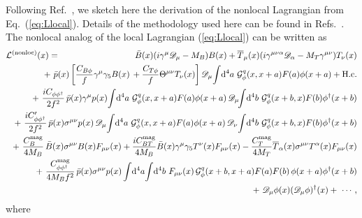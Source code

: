 \documentclass[preprintnumbers,prd,superscriptaddress,preprint]{revtex4-1}
\begin{document}
Following Ref.~\cite{Salamu:2018cny}, we sketch here the derivation of the nonlocal Lagrangian from Eq.~(\ref{eq:Llocal}).
Details of the methodology used here can be found in Refs.~\cite{Terning:1991yt, Holdom:1992fn, Faessler:2003yf, Wang:1996zu, He:2017viu, He:2018eyz}.
The nonlocal analog of the local Lagrangian (\ref{eq:Llocal}) can be written as
%
\begin{eqnarray}
{\cal L}^{\rm (nonloc)}(x)
&=& \bar B(x) (i\gamma^\mu \mathscr{D}_\mu - M_B) B(x)
+ \overline{T}_\mu(x)
  (i\gamma^{\mu\nu\alpha} \mathscr{D}_\alpha - M_T \gamma^{\mu\nu})
  T_\nu(x)
\notag\\
& & \hspace*{-2.2cm}
+\ \bar{p}(x)
  \left[
    \frac{C_{B\phi}}{f} \gamma^\mu \gamma_5 B(x)\,
  + \frac{C_{T\phi}}{f} \Theta^{\mu\nu} T_\nu(x)
  \right]
  \mathscr{D}_\mu\!
  \int\!\dd[4]{a}\, {\cal G}_\phi^q(x,x+a) F(a) \phi(x+a)
  + {\rm H.c.}
\notag\\
& & \hspace*{-2.2cm}
+\ \frac{i C_{\phi\phi^\dag}}{2 f^2}\,
  \bar{p}(x) \gamma^\mu p(x)\!                           
  \int\!\dd[4]{a}\, {\cal G}_\phi^q(x,x+a) F(a) \phi(x+a)\,
  \mathscr{D}_\mu\!\!
  \int\!\dd[4]{b}\, {\cal G}_\phi^q(x+b,x) F(b) \phi^\dag(x+b)
\notag\\
& & \hspace*{-2.2cm}
+\ \frac{i C_{\phi\phi^\dag}'}{2 f^2}\,
  \bar{p}(x) \sigma^{\mu\nu} p(x)\,				
  \mathscr{D}_\mu\! \int\!\dd[4]{a}\, {\cal G}_\phi^q(x,x+a) F(a) \phi(x+a)\,
  \mathscr{D}_\nu\! \int\!\dd[4]{b}\, {\cal G}_\phi^q(x+b,x) F(b) \phi^\dag(x+b)
\notag\\
& & \hspace*{-2.2cm}
+\ \frac{C_B^{\rm mag}}{4 M_B}\,
   \bar B(x) \sigma^{\mu\nu} B(x) F_{\mu\nu}(x)
+  \frac{i C_{BT}^{\rm mag}}{4 M_B}
   \bar B(x) \gamma^\mu\gamma_5 T^\nu(x) F_{\mu\nu}(x)
-  \frac{C_T^{\rm mag}}{4 M_T}
   \overline T_\alpha(x) \sigma^{\mu\nu} T^\alpha(x) F_{\mu\nu}(x)	
\notag\\
& & \hspace*{-2.2cm}
+\ \frac{C_{\phi\phi^\dag}^{\rm mag}}{4 M_B f^2}\,
  \bar{p}(x) \sigma^{\mu\nu} p(x) \int\!\dd[4]{a}\!\int\!\dd[4]{b}\, F_{\mu\nu}(x)\,
  {\cal G}_\phi^q(x+b,x+a) F(a) F(b)\, \phi(x+a) \phi^\dag(x+b)
\notag\\
& & \hspace*{-2.2cm}
+\ \mathscr{D}_\mu \phi(x) (\mathscr{D}_\mu \phi)^\dag(x)
+\ \cdots,
\label{eq:j4}
\end{eqnarray}
%
where
\end{document}
